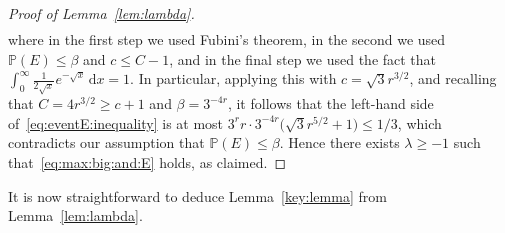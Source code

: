 \documentclass[12pt,reqno]{amsart}
\theoremstyle{definition}
\theoremstyle{remark}
\def\Pr{\mathbb{P}}
\renewcommand{\le}{\leqslant}
\renewcommand{\ge}{\geqslant}
\begin{document}
\begin{proof}[Proof of Lemma~\ref{lem:lambda}]
\begin{align*}
	\end{align*}
	where in the first step we used Fubini's theorem, in the second we used \(\Pr(E) \le \beta\) and \(c \le C - 1\), and in the final step we used the fact that \(\int_0^\infty \frac{1}{2\sqrt{x}} e^{-\sqrt{x}} \, \mathrm{d}x = 1\). In particular, applying this with \(c = \sqrt{3}r^{3/2}\), and recalling that \(C = 4r^{3/2} \ge c + 1\) and \(\beta = 3^{-4r}\), it follows that the left-hand side of~\eqref{eq:eventE:inequality} is at most \(3^r r \cdot 3^{-4r} \big( \sqrt{3}r^{5/2} + 1 \big) \le 1/3\), which contradicts our assumption that \(\Pr(E) \le \beta\). Hence there exists \(\lambda \ge -1\) such that~\eqref{eq:max:big:and:E} holds, as claimed.
\end{proof}
%

It is now straightforward to deduce Lemma~\ref{key:lemma} from Lemma~\ref{lem:lambda}.
\end{document}
